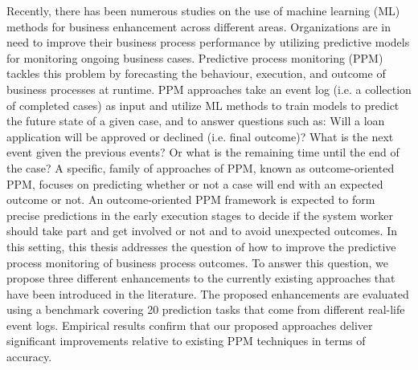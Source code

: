 
\providecommand{\keywords}[1]
{
	\small	
	\textbf{\textit{Keywords---}} #1
}

\begin{abstracts}        %
	Recently, there has been numerous studies on the use of machine learning (ML) methods for business enhancement across different areas. Organizations are in need to improve their business process performance by utilizing predictive models for monitoring ongoing business cases. Predictive process monitoring (PPM) tackles this problem by forecasting the behaviour, execution, and outcome of business processes at runtime. PPM approaches take an event log (i.e. a collection of completed cases) as input and utilize ML methods to train models to predict the future state of a given case, and to answer questions such as: Will a loan application will be approved or declined (i.e. final outcome)? What is the next event given the previous events? Or what is the remaining time until the end of the case? A specific, family of approaches of PPM, known as outcome-oriented PPM, focuses on predicting whether or not a case will end with an expected outcome or not. An outcome-oriented PPM framework is expected to form precise predictions in the early execution stages to decide if the system worker should take part and get involved or not and to avoid unexpected outcomes. In this setting, this thesis addresses the question of how to improve the predictive process monitoring of business process outcomes. To answer this question, we propose three different enhancements to the currently existing approaches that have been introduced in the literature. The proposed enhancements are evaluated using a benchmark covering 20 prediction tasks that come from different real-life event logs. Empirical results confirm that our proposed approaches deliver significant improvements relative to existing PPM techniques in terms of accuracy.

\end{abstracts}
